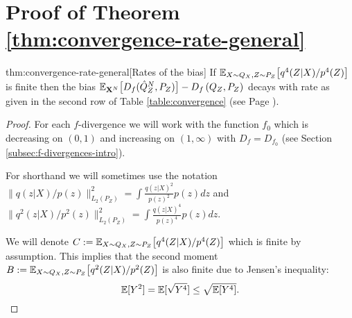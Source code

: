 \section{Proof of Theorem \ref{thm:convergence-rate-general}}\label{proof:thm2}

\begin{reptheorem}{thm:convergence-rate-general}[Rates of the bias]
If $\mathbb{E}_{X\sim Q_X, Z\sim P_Z}\bigl[ q^4(Z|X) / p^4(Z) \bigr]$ is finite then
the bias $\mathbb{E}_{\mathbf{X}^N}\bigl[D_f( \hat{Q}_Z^N , P_Z)\bigr] - D_f\left( Q_{Z} , P_Z\right)$ decays with rate as given in the second row of Table \ref{table:convergence} (see Page \pageref{table:convergence}).
\end{reptheorem}

\begin{proof}
For each $f$-divergence we will work with the function $f_0$ which is decreasing on $(0,1)$ and increasing on $(1, \infty)$ with $D_f = D_{f_0}$ (see Section \ref{subsec:f-divergences-intro}).

For shorthand we will sometimes use the notation $\| q(z|X)/p(z)\|^2_{L_2(P_Z)} = \int \frac{q(z|X)^2}{p(z)^2} p(z) dz$ and $\| q^2(z|X)/p^2(z)\|^2_{L_2(P_Z)} = \int \frac{q(z|X)^4}{p(z)^4} p(z) dz$.

We will denote $C:= \mathbb{E}_{X\sim Q_X, Z\sim P_Z}\bigl[ q^4(Z|X) / p^4(Z) \bigr]$ which is finite by assumption. 
This implies that the second moment $B:= \mathbb{E}_{X\sim Q_X, Z\sim P_Z}\bigl[ q^2(Z|X) / p^2(Z) \bigr]$ is also finite due to Jensen's inequality: 
\[
\mathbb{E}[Y^2] = \mathbb{E}[\sqrt{Y^4}]\leq \sqrt{\mathbb{E}[Y^4]}.
\]


\end{proof}
